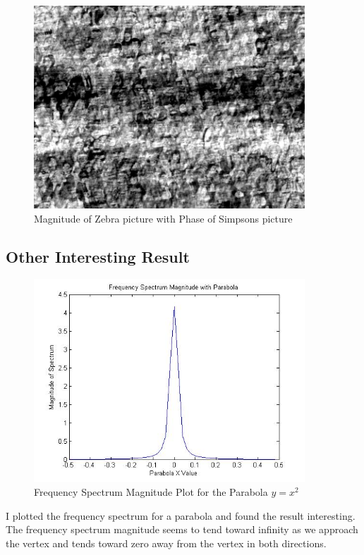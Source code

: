 \documentclass[11pt,psfig]{article}
\begin{document}
\begin{figure}[H]
\centering
\includegraphics[height=3in]{mag_zebra_phase_simpsons.jpg}
\caption{Magnitude of Zebra picture with Phase of Simpsons picture}
\end{figure}

\subsection*{Other Interesting Result}

\begin{figure}[H]
\centering
\includegraphics[height=3in]{prob6plot_freqParabola.jpg}
\caption{Frequency Spectrum Magnitude Plot for the Parabola $y=x^2$}
\end{figure}

I plotted the frequency spectrum for a parabola and found the result interesting. The frequency spectrum magnitude seems to tend toward infinity as we approach the vertex and tends toward zero away from the vertex in both directions.\\
\newpage 
\end{document}
